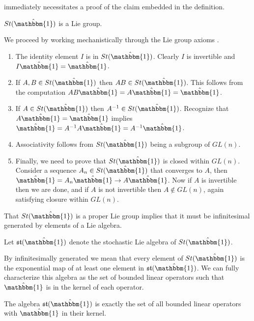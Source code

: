 immediately necessitates a proof of the claim embedded in the definition.
\begin{lemma}
	$St(\hat{\mathbbm{1}})$ is a Lie group.
\end{lemma}
\begin{IEEEproof}
	We proceed by working mechanistically through the Lie group axioms \cite{hall_lie_2004}.
	\begin{enumerate}
		\item The identity element $I$ is in $St(\hat{\mathbbm{1}})$. Clearly $I$ is invertible
		and $I \hat{\mathbbm{1}} = \hat{\mathbbm{1}}$.
		\item If $A,B \in St(\hat{\mathbbm{1}})$ then $AB \in St(\hat{\mathbbm{1}})$. This
		follows from the computation $AB \hat{\mathbbm{1}} = A \hat{\mathbbm{1}} = \hat{\mathbbm{1}}$.
		\item If $A \in St(\hat{\mathbbm{1}})$ then $A^{-1} \in St(\hat{\mathbbm{1}})$.
		Recognize that $A \hat{\mathbbm{1}} = \hat{\mathbbm{1}}$ implies $\hat{\mathbbm{1}} = A^{-1} A \hat{\mathbbm{1}} = A^{-1} \hat{\mathbbm{1}}$.
		\item Associativity follows from $St(\hat{\mathbbm{1}})$ being a subgroup of $GL\left(n\right)$.
		\item Finally, we need to prove that $St(\hat{\mathbbm{1}})$ is closed within $GL\left(n\right)$.
		Consider a sequence $A_n \in St(\hat{\mathbbm{1}})$ that converges to $A$, then $\hat{\mathbbm{1}} = A_n \hat{\mathbbm{1}} \rightarrow A \hat{\mathbbm{1}}$. 
		Now if $A$ is invertible then we are done, and if $A$ is not invertible then $A \notin GL\left(n\right)$,
		again satisfying closure within $GL\left(n\right)$.\hfill\IEEEQEDhere
	\end{enumerate}
\end{IEEEproof}
That $St(\hat{\mathbbm{1}})$ is a proper Lie group implies that it must be infinitesimal
generated by elements of a Lie algebra.
\begin{definition}
	Let $\mathfrak{st}(\hat{\mathbbm{1}})$ denote the stochastic Lie algebra of $St(\hat{\mathbbm{1}})$.
\end{definition}
By infinitesimally generated we mean that every element of $St(\hat{\mathbbm{1}})$ is the
exponential map of at least one element in $\mathfrak{st}(\hat{\mathbbm{1}})$. We can fully
characterize this algebra as the set of bounded linear operators such that $\hat{\mathbbm{1}}$
is in the kernel of each operator.
\begin{lemma}
	The algebra $\mathfrak{st}(\hat{\mathbbm{1}})$ is exactly the set of all bounded linear
	operators with $\hat{\mathbbm{1}}$ in their kernel.
\end{lemma}
